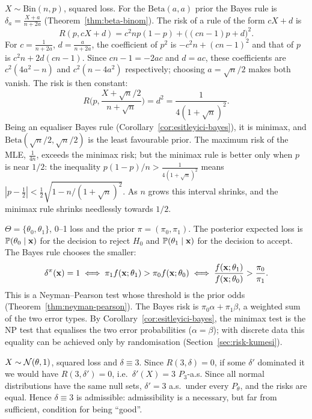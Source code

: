 \documentclass[main.tex]{subfiles}
\begin{document}
\begin{example}\label{ex:binom-minimaks}
$X\sim\text{Bin}(n,p)$, squared loss. For the $\text{Beta}(a,a)$ prior the Bayes rule is $\delta_a=\frac{X+a}{n+2a}$ (Theorem~\ref{thm:beta-binom}). The risk of a rule of the form $cX+d$ is
\[
R(p,cX+d)=c^2np(1-p)+\big((cn-1)p+d\big)^2 .
\]
For $c=\frac1{n+2a}$, $d=\frac a{n+2a}$, the coefficient of $p^2$ is $-c^2n+(cn-1)^2$ and that of $p$ is $c^2n+2d(cn-1)$. Since $cn-1=-2ac$ and $d=ac$, these coefficients are $c^2(4a^2-n)$ and $c^2(n-4a^2)$ respectively; choosing $a=\sqrt n/2$ makes both vanish. The risk is then constant:
\[
R\Big(p,\frac{X+\sqrt n/2}{n+\sqrt n}\Big)=d^2=\frac{1}{4(1+\sqrt n)^2}.
\]
Being an equaliser Bayes rule (Corollary~\ref{cor:esitleyici-bayes}), it is minimax, and $\text{Beta}(\sqrt n/2,\sqrt n/2)$ is the least favourable prior. The maximum risk of the MLE, $\frac1{4n}$, exceeds the minimax risk; but the minimax rule is better only when $p$ is near $1/2$: the inequality $p(1-p)/n>\frac1{4(1+\sqrt n)^2}$ means $|p-\tfrac12|<\tfrac12\sqrt{1-n/(1+\sqrt n)^2}$. As $n$ grows this interval shrinks, and the minimax rule shrinks needlessly towards $1/2$.
\end{example}

\begin{example}\label{ex:test-karar}
$\Theta=\{\theta_0,\theta_1\}$, 0--1 loss and the prior $\pi=(\pi_0,\pi_1)$. The posterior expected loss is $\mathbb{P}(\theta_0\mid\mathbf{x})$ for the decision to reject $H_0$ and $\mathbb{P}(\theta_1\mid\mathbf{x})$ for the decision to accept. The Bayes rule chooses the smaller:
\[
\delta^\pi(\mathbf{x})=1\iff\pi_1f(\mathbf{x};\theta_1)>\pi_0f(\mathbf{x};\theta_0)\iff\frac{f(\mathbf{x};\theta_1)}{f(\mathbf{x};\theta_0)}>\frac{\pi_0}{\pi_1}.
\]
This is a Neyman--Pearson test whose threshold is the prior odds (Theorem~\ref{thm:neyman-pearson}). The Bayes risk is $\pi_0\alpha+\pi_1\beta$, a weighted sum of the two error types. By Corollary~\ref{cor:esitleyici-bayes}, the minimax test is the NP test that equalises the two error probabilities ($\alpha=\beta$); with discrete data this equality can be achieved only by randomisation (Section~\ref{sec:risk-kumesi}).
\end{example}

\begin{example}\label{ex:sabit-kabul}
$X\sim\mathcal{N}(\theta,1)$, squared loss and $\delta\equiv3$. Since $R(3,\delta)=0$, if some $\delta'$ dominated it we would have $R(3,\delta')=0$, i.e.\ $\delta'(X)=3$ $P_3$-a.s. Since all normal distributions have the same null sets, $\delta'=3$ a.s.\ under every $P_\theta$, and the risks are equal. Hence $\delta\equiv3$ is admissible: admissibility is a necessary, but far from sufficient, condition for being ``good''.
\end{example}
\end{document}
